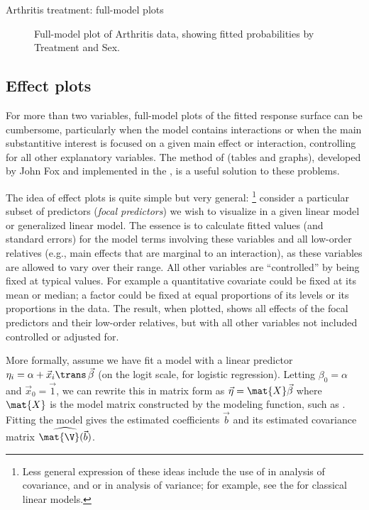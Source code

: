 \documentclass[11pt]{book}
\renewenvironment{knitrout}{\small\renewcommand{\baselinestretch}{.85}}{} %
\begin{document}
\begin{Example}{Arthritis treatment: full-model plots}
\begin{knitrout}
\begin{figure}[!htbp]
\caption[Full-model plot of Arthritis data, showing fitted probabilities by Treatment and Sex]{Full-model plot of Arthritis data, showing fitted probabilities by Treatment and Sex.\label{fig:arth-full2}}
\end{figure}


\end{knitrout}

\end{Example}

\subsection{Effect plots}\label{sec:effplots}
For more than two variables, full-model plots of the fitted response surface can
be cumbersome, particularly when the model contains interactions or when the main
substantitive interest is focused on a given main effect or interaction, controlling
for all other explanatory variables.
The method of  (tables and graphs), developed by
John Fox \citeyearpar{Fox:87,Fox:03:effects} and implemented in the ,
is a useful solution to these problems.

The idea of effect plots is quite simple but very general:%
\footnote{
Less general expression of these ideas include the use of 
in analysis of covariance, and  
or  \citep{Searle-etal:80}
in analysis of variance; for example, see the  for classical linear models.
}
consider a particular
subset of predictors (\emph{focal predictors}) we wish to visualize in a given
linear model or generalized linear model.  The essence is to calculate fitted
values (and standard errors) for the model terms involving these variables
and all low-order relatives (e.g., main effects that are marginal to an interaction),
as these variables are allowed to vary over their range.  All other variables
are ``controlled'' by being fixed at typical values. For example a quantitative
covariate could be fixed at its mean or median; a factor could be fixed at
equal proportions of its levels or its proportions in the data.
The result, when plotted, shows all effects of the focal predictors and their
low-order relatives, but with all other variables not included controlled or
adjusted for.

More formally, assume we have fit a model with a linear predictor
$\eta_i =  \alpha + \vec{x}_{i}\trans \,  \vec{\beta} $ 
(on the logit scale, for logistic regression).
Letting $\beta_0 = \alpha$ and $\vec{x}_0 = \vec{1}$, we can rewrite this
in matrix form as $\vec{\eta} = \mat{X} \vec{\beta}$ where $\mat{X}$ is
the model matrix constructed by the modeling function, such as .
Fitting the model gives the estimated coefficients $\vec{b}$ and
its estimated covariance matrix $\widehat{\mat{\V} (\vec{b})}$.
\end{document}
